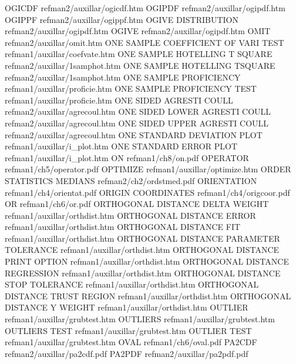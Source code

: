 OGICDF                                  refman2/auxillar/ogicdf.htm
OGIPDF                                  refman2/auxillar/ogipdf.htm
OGIPPF                                  refman2/auxillar/ogippf.htm
OGIVE DISTRIBUTION                      refman2/auxillar/ogipdf.htm
OGIVE                                   refman2/auxillar/ogipdf.htm
OMIT                                    refman2/auxillar/omit.htm
ONE SAMPLE COEFFICIENT OF VARI TEST     refman1/auxillar/coefvate.htm
ONE SAMPLE HOTELLING T SQUARE           refman2/auxillar/1samphot.htm
ONE SAMPLE HOTELLING TSQUARE            refman2/auxillar/1samphot.htm
ONE SAMPLE PROFICIENCY                  refman1/auxillar/proficie.htm
ONE SAMPLE PROFICIENCY TEST             refman1/auxillar/proficie.htm
ONE SIDED AGRESTI COULL                 refman2/auxillar/agrecoul.htm
ONE SIDED LOWER AGRESTI COULL           refman2/auxillar/agrecoul.htm
ONE SIDED UPPER AGRESTI COULL           refman2/auxillar/agrecoul.htm
ONE STANDARD DEVIATION PLOT             refman1/auxillar/i_plot.htm
ONE STANDARD ERROR PLOT                 refman1/auxillar/i_plot.htm
ON                                      refman1/ch8/on.pdf
OPERATOR                                refman1/ch5/operator.pdf
OPTIMIZE                                refman1/auxillar/optimize.htm
ORDER STATISTICS MEDIANS                refman2/ch2/ordstmed.pdf
ORIENTATION                             refman1/ch4/orientat.pdf
ORIGIN COORDINATES                      refman1/ch4/origcoor.pdf
OR                                      refman1/ch6/or.pdf
ORTHOGONAL DISTANCE DELTA WEIGHT        refman1/auxillar/orthdist.htm
ORTHOGONAL DISTANCE ERROR               refman1/auxillar/orthdist.htm
ORTHOGONAL DISTANCE FIT                 refman1/auxillar/orthdist.htm
ORTHOGONAL DISTANCE PARAMETER TOLERANCE refman1/auxillar/orthdist.htm
ORTHOGONAL DISTANCE PRINT OPTION        refman1/auxillar/orthdist.htm
ORTHOGONAL DISTANCE REGRESSION          refman1/auxillar/orthdist.htm
ORTHOGONAL DISTANCE STOP TOLERANCE      refman1/auxillar/orthdist.htm
ORTHOGONAL DISTANCE TRUST REGION        refman1/auxillar/orthdist.htm
ORTHOGONAL DISTANCE Y WEIGHT            refman1/auxillar/orthdist.htm
OUTLIER                                 refman1/auxillar/grubtest.htm
OUTLIERS                                refman1/auxillar/grubtest.htm
OUTLIERS TEST                           refman1/auxillar/grubtest.htm
OUTLIER TEST                            refman1/auxillar/grubtest.htm
OVAL                                    refman1/ch6/oval.pdf
PA2CDF                                  refman2/auxillar/pa2cdf.pdf
PA2PDF                                  refman2/auxillar/pa2pdf.pdf
